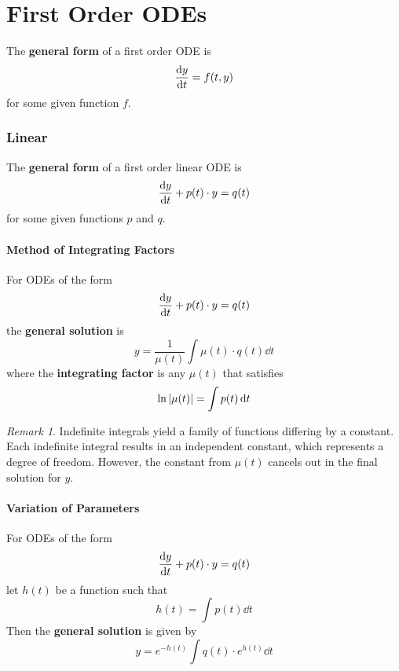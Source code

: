 \documentclass[10pt,UTF8]{article}
\newenvironment{theoremBox}
{
  \begin{tcolorbox}[colback=yellow!5!white,colframe=yellow!75!black,parbox=false,before
  upper=\par,before lower=\par]}
  {
\end{tcolorbox}}
\theoremstyle{definition}
\newtheorem{definition inner}{Definition}[section]
\theoremstyle{definition}
\newtheorem{theorem inner}{Theorem}[section]
\theoremstyle{definition}
\newtheorem*{proof inner}{\textit{Proof}}
\theoremstyle{plain}
\newtheorem{tip inner}{Tip}[section]
\theoremstyle{remark}
\newtheorem*{remark}{\textit{Remark}}
\begin{document}
\part*{First Order ODEs}

The \textbf{general form} of a first order ODE is
\[
  \dv{y}{t} = f(t,y)
\]
for some given function \(f\).

\section{Linear}

The \textbf{general form} of a first order linear ODE is
\[
  \dv{y}{t} + p(t)\cdot y = q(t)
\]
for some given functions \(p\) and \(q\).

\subsection{Method of Integrating Factors}

\begin{theoremBox}
  For ODEs of the form
  \[
    \dv{y}{t} + p(t)\cdot y = q(t)
  \]
  the \textbf{general solution} is
  \[
    y = \frac{1}{\mu(t)} \int \mu(t)\cdot q(t)\dd{t}
  \]
  where the \textbf{integrating factor} is any \(\mu(t)\) that satisfies
  \[
    \ln\abs{\mu(t)} = \int p(t)\dd{t}
  \]
\end{theoremBox}
\begin{remark}
  Indefinite integrals yield a family of functions differing by a constant.
  Each indefinite integral results in an independent constant, which
  represents a degree of freedom.
  However, the constant from \(\mu(t)\) cancels out in the final
  solution for \(y\).
\end{remark}


\subsection{Variation of Parameters}

\begin{theoremBox}
  For ODEs of the form
  \[
    \dv{y}{t} + p(t)\cdot y = q(t)
  \]
  let \(h(t)\) be a function such that
  \[
    h(t) = \int p(t)\dd{t}
  \]
  Then the \textbf{general solution} is given by
  \[
    y = e^{-h(t)} \int q(t)\cdot e^{h(t)} \dd{t}
  \]
\end{theoremBox}

\subsection{}
\end{document}
